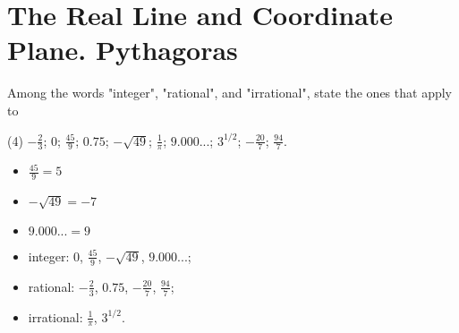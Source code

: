 \section{The Real Line and Coordinate Plane. Pythagoras}

\begin{questions}
  \item Among the words "integer", "rational", and "irrational", state the ones that apply to
  \begin{tasks}(4)
    \task \( -\frac{2}{3}\);
    \task \(0\);
    \task \(\frac{45}{9}\);
    \task \(0.75\);
    \task \(-\sqrt{49}\);
    \task \(\frac{1}{\pi}\);
    \task \(9.000...\);
    \task \(3^{1/2}\);
    \task \(-\frac{20}{7}\);
    \task \(\frac{94}{7}\).
  \end{tasks}
  \begin{note}
    \begin{itemize}
      \item \(\frac{45}{9} = 5\)
      \item \(-\sqrt{49} = -7\)
      \item \(9.000... = 9\)
    \end{itemize}
  \end{note}
  \begin{solution}
    \begin{itemize}
      \item integer: \(0\), \(\frac{45}{9}\), \(-\sqrt{49}\), \(9.000...\);
      \item rational: \(-\frac{2}{3}\), \(0.75\), \(-\frac{20}{7}\), \(\frac{94}{7}\);
      \item irrational: \(\frac{1}{\pi}\), \(3^{1/2}\).
    \end{itemize}
  \end{solution}
\end{questions}